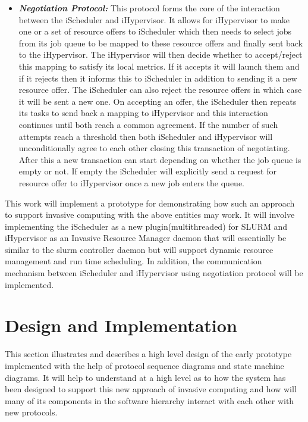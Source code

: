\documentclass{acm_proc_article-sp}
\begin{document}
\begin{itemize}
\item \textbf{\textit{Negotiation Protocol:}} This protocol forms the core of the interaction between the iScheduler and iHypervisor. It allows for iHypervisor to make one or a set of resource offers to iScheduler which then needs to select jobs from its job queue to be mapped to these resource offers and finally sent back to the iHypervisor. The iHypervisor will then decide whether to accept/reject this mapping to satisfy its local metrics. If it accepts it will launch them and if it rejects then it informs this to iScheduler in addition to sending it a new resource offer. The iScheduler can also reject the resource offers in which case it will be sent a new one. On accepting an offer, the iScheduler then repeats its tasks to send back a mapping to iHypervisor and this interaction continues until both reach a common agreement. If the number of such attempts reach a threshold then both iScheduler and iHypervisor will unconditionally agree to each other closing this transaction of negotiating. After this a new transaction can start depending on whether the job queue is empty or not. If empty the iScheduler will explicitly send a request for resource offer to iHypervisor once a new job enters the queue.
\end{itemize}
\noindent
This work will implement a prototype for demonstrating how such an approach to support invasive computing with the above entities may work. It will involve implementing the iScheduler as a new plugin(multithreaded) for SLURM and iHypervisor as an Invasive Resource Manager daemon that will essentially be similar to the slurm controller daemon but will support dynamic resource management and run time scheduling. In addition, the communication mechanism between iScheduler and iHypervisor using negotiation protocol will be implemented.
\section{Design and Implementation}
This section illustrates and describes a high level design of the early prototype implemented with the help of protocol sequence diagrams and state machine diagrams. It will help to understand at a high level as to how the system has been designed to support this new approach of invasive computing and how will many of its components in the software hierarchy interact with each other with new protocols.
\end{document}
